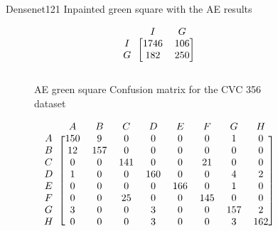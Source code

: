 \begin{figure}
\caption{Densenet121 Inpainted green square with the AE results}
\myfontsize
\caption*{\footnotesize \textmd{ \textbf{A}:{dyed-lifted-polyps} , \textbf{B}:{dyed-resection-margins} , \textbf{C}:{esophagitis} , \textbf{D}:{normal-cecum} , \textbf{E}:{normal-pylorus} , \textbf{F}:{normal-z-line} , \textbf{G}:{polyps} , \textbf{H}:{ulcerative-colitis} , \textbf{I}:{non-polyp}}}

\begin{subfigure}[b]{0.25\textwidth}
     
\[
\begin{blockarray}{ccc}
& I & G  \\
\begin{block}{c[cc]}
        I&1746 & 106\\
        G&  182 & 250\\
\end{block}
\end{blockarray}
 \]         

\caption{AE green square Confusion matrix for the CVC 356 dataset}
\label{mat:cvc356_CM_DN121_AE_SQUARE}
\end{subfigure}
\begin{subfigure}[b]{0.49\textwidth}  
\scriptsize     
\[
\begin{blockarray}{ccccccccc}
& A & B & C & D & E & F & G & H \\
\begin{block}{c[cccccccc]}
A&150 & 9 & 0 & 0 & 0 & 0 & 1 & 0\\
B& 12 & 157 & 0 & 0 & 0 & 0 & 0 & 0\\
C&  0 & 0 & 141 & 0 & 0 & 21 & 0 & 0\\
D&  1 & 0 & 0 & 160 & 0 & 0 & 4 & 2\\
E&  0 & 0 & 0 & 0 & 166 & 0 & 1 & 0\\
F&  0 & 0 & 25 & 0 & 0 & 145 & 0 & 0\\
G&  3 & 0 & 0 & 3 & 0 & 0 & 157 & 2\\
H&  0 & 0 & 0 & 3 & 0 & 0 & 3 & 162\\
\end{block}
\end{blockarray}
 \]        
        

\end{subfigure}
\end{figure}
